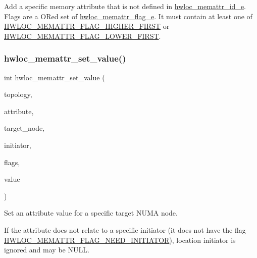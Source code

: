 Add a specific memory attribute that is not defined in \hyperlink{a00211_gab4bde745db676fc2ea4b47011cd9a80e}{hwloc\+\_\+memattr\+\_\+id\+\_\+e}. Flags are a OR\textquotesingle{}ed set of \hyperlink{a00212_ga78aceb4cac4d614c0f5e82dbfeb779e5}{hwloc\+\_\+memattr\+\_\+flag\+\_\+e}. It must contain at least one of \hyperlink{a00212_gga78aceb4cac4d614c0f5e82dbfeb779e5af29e65444a6ed00f5cc246df06f65815}{H\+W\+L\+O\+C\+\_\+\+M\+E\+M\+A\+T\+T\+R\+\_\+\+F\+L\+A\+G\+\_\+\+H\+I\+G\+H\+E\+R\+\_\+\+F\+I\+R\+ST} or \hyperlink{a00212_gga78aceb4cac4d614c0f5e82dbfeb779e5a9601b5b0e1e68635e7e9901f28bd93bf}{H\+W\+L\+O\+C\+\_\+\+M\+E\+M\+A\+T\+T\+R\+\_\+\+F\+L\+A\+G\+\_\+\+L\+O\+W\+E\+R\+\_\+\+F\+I\+R\+ST}. \mbox{\label{a00212_ga960529c08b25cf15825e0f72ecceb504}} 
\subsubsection{\texorpdfstring{hwloc\+\_\+memattr\+\_\+set\+\_\+value()}{hwloc\_memattr\_set\_value()}}
{\footnotesize\ttfamily int hwloc\+\_\+memattr\+\_\+set\+\_\+value (\begin{DoxyParamCaption}\item[{\hyperlink{a00186_ga9d1e76ee15a7dee158b786c30b6a6e38}{hwloc\+\_\+topology\+\_\+t}}]{topology,  }\item[{\hyperlink{a00211_gacc82003a8610be554615995f0996c888}{hwloc\+\_\+memattr\+\_\+id\+\_\+t}}]{attribute,  }\item[{\hyperlink{a00185_ga79b8ab56877ef99ac59b833203391c7d}{hwloc\+\_\+obj\+\_\+t}}]{target\+\_\+node,  }\item[{struct \hyperlink{a00314}{hwloc\+\_\+location} $\ast$}]{initiator,  }\item[{unsigned long}]{flags,  }\item[{hwloc\+\_\+uint64\+\_\+t}]{value }\end{DoxyParamCaption})}



Set an attribute value for a specific target N\+U\+MA node. 

If the attribute does not relate to a specific initiator (it does not have the flag \hyperlink{a00212_gga78aceb4cac4d614c0f5e82dbfeb779e5a9d16523e285b2e22cfc78cc84dce8c96}{H\+W\+L\+O\+C\+\_\+\+M\+E\+M\+A\+T\+T\+R\+\_\+\+F\+L\+A\+G\+\_\+\+N\+E\+E\+D\+\_\+\+I\+N\+I\+T\+I\+A\+T\+OR}), location {\ttfamily initiator} is ignored and may be {\ttfamily N\+U\+LL}.

